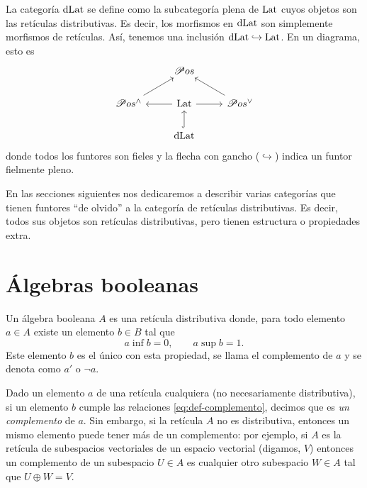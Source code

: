 La categoría $\mathrm{dLat}$ se define como la subcategoría plena de
$\mathrm{Lat}$ cuyos objetos son las retículas distributivas.
Es decir, los morfismos en $\mathrm{dLat}$ son simplemente morfismos de
retículas. Así, tenemos una inclusión $\mathrm{dLat}\hookrightarrow\mathrm{Lat}$.
En un diagrama, esto es
\[
    \begin{tikzcd}
        & \Pos \\
        \Pos^\wedge \arrow[ru]
            & \Lat \arrow[r] \arrow[l]
            & \Pos^\vee \arrow[lu] \\
        & \DLat \arrow[u,hook]
    \end{tikzcd}
\]
donde todos los funtores son fieles y la flecha con gancho
($\hookrightarrow$) indica un funtor fielmente pleno.

En las secciones siguientes nos dedicaremos a describir varias
categorías que tienen funtores ``de olvido'' a la categoría de
retículas distributivas. Es decir, todos sus objetos son retículas
distributivas, pero tienen estructura o propiedades extra.

\section{Álgebras booleanas}
\label{ss:complementos-algebras-booleanas}

\begin{defn}
  Un álgebra booleana $A$ es una retícula distributiva
  donde, para todo elemento $a\in A$ existe un elemento $b\in B$ tal
  que
  \begin{equation}\label{eq:def-complemento}
    a\inf b = 0, \qquad a\sup b = 1.
  \end{equation}
  Este elemento $b$ es el único con esta propiedad, se llama el
  complemento de $a$ y se denota como $a'$ o $\neg a$.
\end{defn}

Dado un elemento $a$ de una retícula cualquiera (no necesariamente
distributiva), si un elemento $b$ cumple las relaciones
\ref{eq:def-complemento}, decimos que es \emph{un complemento} de $a$.
Sin embargo, si la retícula $A$ no es
distributiva, entonces un mismo elemento puede
tener más de un complemento: por ejemplo, si $A$ es la retícula de
subespacios vectoriales de un espacio vectorial (digamos, $V$)
entonces un complemento de un subespacio $U\in A$ es cualquier otro
subespacio $W\in A$ tal que $U\oplus W=V$.

